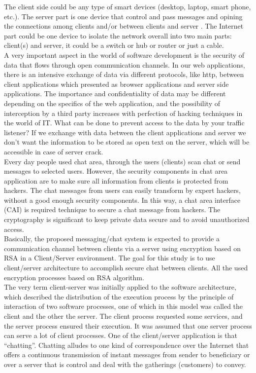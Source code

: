 The client side could be any type of smart devices
(desktop, laptop, smart phone, etc.). The server part is one
device that control and pass messages and opining the
connections among clients and/or between clients and server
. The Internet part could be one device to isolate the
network overall into two main parts: client(s) and server, it
could be a switch or hub or router or just a cable.\\
A very important aspect in the world of software
development is the security of data that flows through open
communication channels. In our web applications,
there is an intensive exchange of data via different
protocols, like http, between client applications which
presented as browser applications and
server side applications. The importance and confidentiality
of data may be different depending on the specifics of the
web application, and the possibility of interception by a third
party increases with perfection of hacking techniques in the
world of IT. What can be done to prevent access to the
data by your traffic listener? If we exchange with data
between the client applications and server we don’t want the
information to be stored as open text on the server, which will
be accessible in case of server crack.\\
Every day people used chat area, through the users
(clients) scan chat or send messages to selected users.
However, the security components in chat area application
are to make sure all information from clients is protected
from hackers. The chat messages from users can easily
transform by expert hackers, without a good enough security
components. In this way, a chat area interface (CAI) is
required technique to secure a chat message from hackers.
The cryptography is significant to keep private data secure
and to avoid unauthorized access.\\
Basically, the proposed messaging/chat system is
expected to provide a communication channel between
clients via a server using encryption based on RSA in a
Client/Server environment. The goal for this study is
to use client/server architecture to accomplish secure chat
between clients. All the used encryption
processes based on RSA algorithm.\\
The very term client-server was initially applied to the
software architecture, which described the distribution of the
execution process by the principle of interaction of two
software processes, one of which in this model was called the
client and the other the server. The client process requested
some services, and the server process ensured their execution.
It was assumed that one server process can serve a lot of
client processes. One of the client/server application is that
“chatting”. Chatting alludes to one kind of correspondence
over the Internet that offers a continuous transmission of
instant messages from sender to beneficiary or over a server
that is control and deal with the gatherings (customers) to
convey.\cite{sonmez2017development}\\
